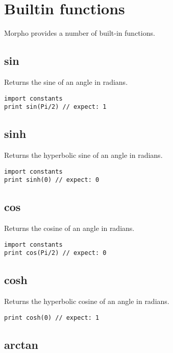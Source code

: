 \hypertarget{builtin-functions}{%
\section{Builtin functions}\label{builtin-functions}}

Morpho provides a number of built-in functions.

\hypertarget{sin}{%
\subsection{sin}\label{sin}}

Returns the sine of an angle in radians.

\begin{lstlisting}
import constants 
print sin(Pi/2) // expect: 1
\end{lstlisting}

\hypertarget{sinh}{%
\subsection{sinh}\label{sinh}}

Returns the hyperbolic sine of an angle in radians.

\begin{lstlisting}
import constants 
print sinh(0) // expect: 0
\end{lstlisting}

\hypertarget{cos}{%
\subsection{cos}\label{cos}}

Returns the cosine of an angle in radians.

\begin{lstlisting}
import constants 
print cos(Pi/2) // expect: 0
\end{lstlisting}

\hypertarget{cosh}{%
\subsection{cosh}\label{cosh}}

Returns the hyperbolic cosine of an angle in radians.

\begin{lstlisting}
print cosh(0) // expect: 1
\end{lstlisting}

\hypertarget{arctan}{%
\subsection{arctan}\label{arctan}}

